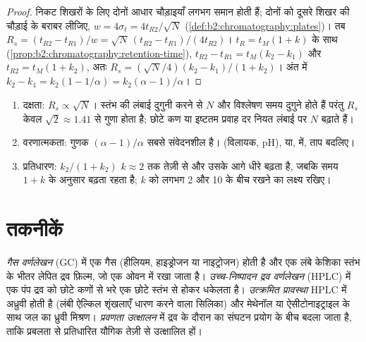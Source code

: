 \begin{proof}
निकट शिखरों के लिए दोनों आधार चौड़ाइयाँ लगभग समान होती हैं; दोनों को दूसरे शिखर की चौड़ाई के बराबर लीजिए,
$w = 4\sigma_t = 4t_{R2}/\sqrt N$ (\cref{def:b2:chromatography:plates})। तब $R_s = (t_{R2} -
t_{R1})/w = \sqrt N\,(t_{R2} - t_{R1})/(4t_{R2})$। $t_R = t_M(1 + k)$ के साथ
(\cref{prop:b2:chromatography:retention-time}), $t_{R2} - t_{R1} = t_M(k_2 - k_1)$ और $t_{R2} =
t_M(1 + k_2)$, अतः $R_s = (\sqrt N/4)(k_2 - k_1)/(1 + k_2)$। अंत में $k_2 - k_1 = k_2(1 - 1/\alpha) =
k_2(\alpha - 1)/\alpha$।
\end{proof}

\begin{method}[विभेदन में सुधार]\label{met:b2:chromatography:improve-resolution}
\begin{enumerate}
  \item दक्षता: $R_s \propto \sqrt N$। स्तंभ की लंबाई दुगुनी करने से $N$ और विश्लेषण समय दुगुने होते हैं
        परंतु $R_s$ केवल $\sqrt2 \approx 1.41$ से गुणा होता है; छोटे कण या इष्टतम प्रवाह दर
        नियत लंबाई पर $N$ बढ़ाते हैं।
  \item वरणात्मकता: गुणक $(\alpha - 1)/\alpha$ सबसे संवेदनशील है। 
        (विलायक, pH),  या,  में, ताप बदलिए।
  \item प्रतिधारण: $k_2/(1+k_2)$ $k \approx 2$ तक तेज़ी से और उसके आगे धीरे बढ़ता है, जबकि समय
        $1 + k$ के अनुसार बढ़ता रहता है; $k$ को लगभग 2 और 10 के बीच रखने का लक्ष्य रखिए।
\end{enumerate}
\end{method}

\section{तकनीकें}

\begin{definition}[वर्णलेखी तकनीकें]\label{def:b2:chromatography:techniques}
\emph{गैस वर्णलेखन} (GC) में  एक गैस (हीलियम, हाइड्रोजन
या नाइट्रोजन) होती है और  एक लंबे केशिका स्तंभ के भीतर लेपित द्रव फ़िल्म, जो
एक ओवन में रखा जाता है। \emph{उच्च-निष्पादन द्रव वर्णलेखन}
(HPLC) में एक पंप द्रव  को छोटे कणों से भरे एक छोटे स्तंभ से होकर
धकेलता है। \emph{उत्क्रमित प्रावस्था} HPLC में  अध्रुवी होती है
(लंबी ऐल्किल शृंखलाएँ धारण करने वाला सिलिका) और  मेथेनॉल या
ऐसीटोनाइट्राइल के साथ जल का ध्रुवी मिश्रण। \emph{प्रवणता उत्क्षालन} में द्रव  के दौरान
 का संघटन प्रयोग के बीच बदला जाता है, ताकि प्रबलता से प्रतिधारित यौगिक तेज़ी से उत्क्षालित हों।
\end{definition}

